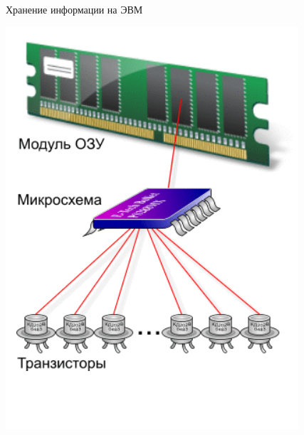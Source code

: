 \documentclass[10pt,pdf,hyperref={unicode}]{beamer}%
\begin{document}
\begin{frame}{Хранение информации на ЭВМ}
  \begin{minipage}{0.4\textwidth}
    \includegraphics[width=\textwidth]{ozu.png}
\end{minipage}
\hfill
  \begin{minipage}{0.4\textwidth}

\end{minipage}
\end{frame}
\end{document}
